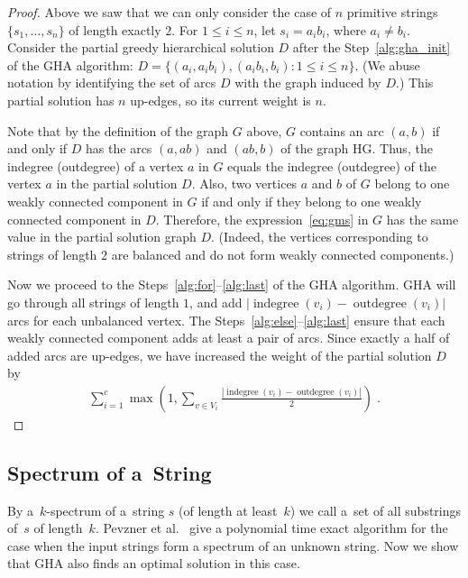 \documentclass[11pt]{article}
\DeclareMathOperator{\indegree}{indegree}
\DeclareMathOperator{\outdegree}{outdegree}
\renewcommand{\leq}{\leqslant}
\begin{document}
\begin{proof}
Above we saw that we can only consider the case of $n$ primitive strings $\{s_1,\ldots,s_n\}$ of length exactly $2$. For $1\leq i\leq n$, let $s_i=a_i b_i$, where $a_i\neq b_i$. Consider the partial greedy hierarchical solution $D$ after the Step~\ref{alg:gha_init} of the GHA algorithm: $D=\{(a_i, a_ib_i), (a_ib_i, b_i): 1\leq i\leq n \}$. (We abuse notation by identifying the set of arcs $D$ with the graph induced by $D$.) This partial solution has $n$ up-edges, so its current weight is $n$. 

Note that by the definition of the graph $G$ above, $G$ contains an arc $(a, b)$ if and only if $D$ has the arcs $(a, ab)$ and $(ab, b)$ of the graph HG. Thus, the indegree (outdegree) of a vertex $a$ in $G$ equals the indegree (outdegree) of the vertex $a$ in the partial solution $D$. Also, two vertices $a$ and $b$ of $G$ belong to one weakly connected component in $G$ if and only if they belong to one weakly connected component in $D$. Therefore, the expression~\ref{eq:gms} in $G$ has the same value in the partial solution graph $D$. (Indeed, the vertices corresponding to strings of length $2$ are balanced and do not form weakly connected components.) 

Now we proceed to the Steps~\ref{alg:for}--\ref{alg:last} of the GHA algorithm. GHA will go through all strings of length $1$, and add $|\indegree(v_i) - \outdegree(v_i)|$ arcs for each unbalanced vertex. The Steps~\ref{alg:else}--\ref{alg:last} ensure that each weakly connected component adds at least a pair of arcs. Since exactly a half of added arcs are up-edges, we have increased the weight of the partial solution $D$ by
\begin{align*}
\sum_{i=1}^{c} {\max\left( 1, \sum_{v \in V_i}{ \frac{ |\indegree(v_i) - \outdegree(v_i)|}{2} }\right)} \; .
\end{align*}
\end{proof}

\subsection{Spectrum of a~String}
By a~$k$-spectrum of a~string $s$ 
(of length at least~$k$)
we call a~set of all substrings of~$s$ of length~$k$.
Pevzner et al.~\cite{pevzner2001eulerian} give a polynomial time exact algorithm for the case when the input strings form a spectrum of an unknown string. Now we show that GHA also finds an optimal solution in this case.
\end{document}
